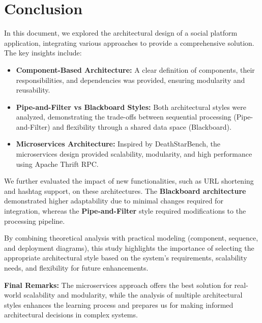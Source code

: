 \documentclass[a4paper,12pt]{article}
\begin{document}
\section{Conclusion}

In this document, we explored the architectural design of a social platform application, integrating various approaches to provide a comprehensive solution. The key insights include:

\begin{itemize}
    \item \textbf{Component-Based Architecture:} A clear definition of components, their responsibilities, and dependencies was provided, ensuring modularity and reusability.
    \item \textbf{Pipe-and-Filter vs Blackboard Styles:} Both architectural styles were analyzed, demonstrating the trade-offs between sequential processing (Pipe-and-Filter) and flexibility through a shared data space (Blackboard).
    \item \textbf{Microservices Architecture:} Inspired by DeathStarBench, the microservices design provided scalability, modularity, and high performance using Apache Thrift RPC.
\end{itemize}

We further evaluated the impact of new functionalities, such as URL shortening and hashtag support, on these architectures. The \textbf{Blackboard architecture} demonstrated higher adaptability due to minimal changes required for integration, whereas the \textbf{Pipe-and-Filter} style required modifications to the processing pipeline.

By combining theoretical analysis with practical modeling (component, sequence, and deployment diagrams), this study highlights the importance of selecting the appropriate architectural style based on the system's requirements, scalability needs, and flexibility for future enhancements.

\textbf{Final Remarks:} The microservices approach offers the best solution for real-world scalability and modularity, while the analysis of multiple architectural styles enhances the learning process and prepares us for making informed architectural decisions in complex systems.
\end{document}
